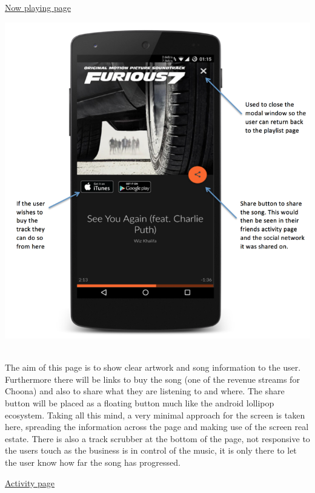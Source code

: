 \newpage

\noindent\underline{Now playing page}\newline

\noindent
\begin{minipage}{\linewidth}
\centering
\includegraphics[scale=1]{./img/nowplayingannotated.png}
\label{fig:nowplaying}
\end{minipage}\\

The aim of this page is to show clear artwork and song information to the user. Furthermore there will be links to buy the song (one of the revenue streams for Choona) and also to share what they are listening to and where. The share button will be placed as a floating button much like the android lollipop ecosystem. Taking all this mind, a very minimal approach for the screen is taken here, spreading the information across the page and making use of the screen real estate. There is also a track scrubber at the bottom of the page, not responsive to the users touch as the business is in control of the music, it is only there to let the user know how far the song has progressed.   

\newpage

\noindent\underline{Activity page}\newline

